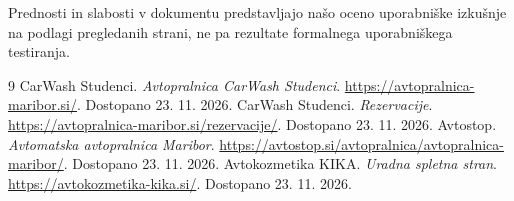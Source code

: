 \documentclass[11pt,a4paper]{article}
\begin{document}
Prednosti in slabosti v dokumentu predstavljajo našo oceno uporabniške izkušnje na podlagi pregledanih strani, ne pa rezultate formalnega uporabniškega testiranja.

\begin{thebibliography}{9}
 CarWash Studenci. \emph{Avtopralnica CarWash Studenci}. \url{https://avtopralnica-maribor.si/}. Dostopano 23. 11. 2026.
 CarWash Studenci. \emph{Rezervacije}. \url{https://avtopralnica-maribor.si/rezervacije/}. Dostopano 23. 11. 2026.
 Avtostop. \emph{Avtomatska avtopralnica Maribor}. \url{https://avtostop.si/avtopralnica/avtopralnica-maribor/}. Dostopano 23. 11. 2026.
 Avtokozmetika KIKA. \emph{Uradna spletna stran}. \url{https://avtokozmetika-kika.si/}. Dostopano 23. 11. 2026.
\end{thebibliography}
\end{document}
